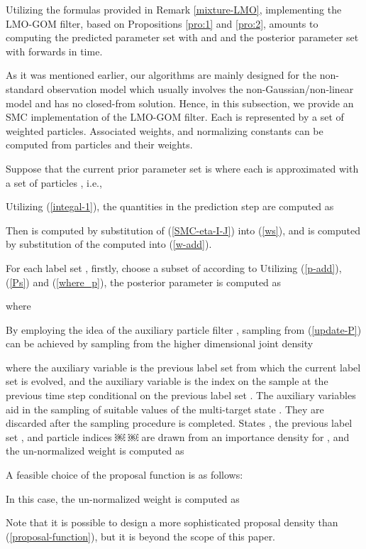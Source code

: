 \documentclass[journal]{IEEEtran}
\begin{document}
{Utilizing the formulas provided in Remark \ref{mixture-LMO},  implementing the LMO-GOM filter, based on Propositions \ref{pro:1} and \ref{pro:2}, amounts to computing the predicted parameter set   
with  
and 
and the posterior parameter set  
with 
forwards in time.


As  it was mentioned earlier, our algorithms are mainly designed for the non-standard observation model which usually involves the non-Gaussian/non-linear model and has no closed-from solution. Hence, in this subsection, we provide an SMC implementation of the LMO-GOM filter.  Each  is represented by a set of weighted particles. Associated weights, and normalizing constants can be computed from 
particles and their weights.

Suppose that the current prior parameter set is  where each  is approximated with a set of particles , i.e.,

Utilizing (\ref{integal-1}), the  quantities in the prediction step are computed as 


Then   is computed by substitution of (\ref{SMC-eta-I-J})  into (\ref{ws}), and   is computed by substitution of the computed  into (\ref{w-add}).


For each label set ,  firstly, choose a subset  of   according to  
Utilizing (\ref{p-add}), (\ref{Ps}) and (\ref{where_p}), the posterior parameter  is computed as

where

By employing the idea of the auxiliary particle filter \cite{refr:tbd-2,refr:tbd-3,refr:tbd-4}, sampling from (\ref{update-P}) can be achieved by sampling from the higher dimensional joint density

where the auxiliary variable  is the previous label set from which the current label set  is evolved, and  the auxiliary variable  is the index on the sample at the previous time step conditional on the previous label set .
The auxiliary variables aid in the sampling of suitable values of the multi-target state . They are discarded after the sampling procedure is completed. States , the previous label set ,
and particle indices ￼ ￼ are drawn from an importance density  for , and the un-normalized weight is computed as 

A  feasible choice of the  proposal function  is as follows:

In this case, the un-normalized weight is computed as 

Note that it is possible to design a more sophisticated proposal density than (\ref{proposal-function}), but it is beyond the scope of this paper.


}
\end{document}
